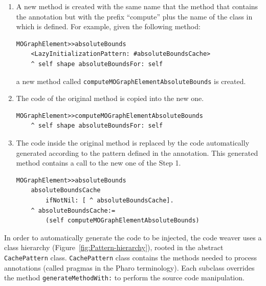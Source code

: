 \documentclass[preprint,10pt]{sigplanconf}
\newcommand{\ct}{\lstinline[backgroundcolor=\color{white},basicstyle=\footnotesize\ttfamily]}
\newcommand{\figref}[1]{Figure~\ref{fig:#1}\xspace}
\begin{document}
\begin{enumerate}
\item A new method is created with the same name that the method that contains
the annotation but with the prefix {}``compute'' plus the name of the
class in which is defined. For example, given the following method:
\begin{lstlisting} 
MOGraphElement>>absoluteBounds
	<LazyInitializationPattern: #absoluteBoundsCache> 
	^ self shape absoluteBoundsFor: self
\end{lstlisting}
a new method called \ct{computeMOGraphElementAbsoluteBounds} is created.
\item The code of the original method is copied into the new one.
\begin{lstlisting} 
MOGraphElement>>computeMOGraphElementAbsoluteBounds
	^ self shape absoluteBoundsFor: self
\end{lstlisting}
\item The code inside the original method is replaced by the code automatically
generated according to the pattern defined in the annotation. This generated
method contains a call to the new one of the Step 1.
\begin{lstlisting} 
MOGraphElement>>absoluteBounds
	absoluteBoundsCache 
		ifNotNil: [ ^ absoluteBoundsCache].
	^ absoluteBoundsCache:=
		(self computeMOGraphElementAbsoluteBounds)
\end{lstlisting}
\end{enumerate}

In order to automatically generate the code to be injected, the code weaver uses a class hierarchy (\figref{Pattern-hierarchy}), rooted in the abstract \ct{CachePattern} class.
\ct{CachePattern} class contains the methods needed to process annotations (called pragmas in the Pharo terminology). Each subclass overrides the method \ct{generateMethodWith:} to perform the source code manipulation.
\end{document}
